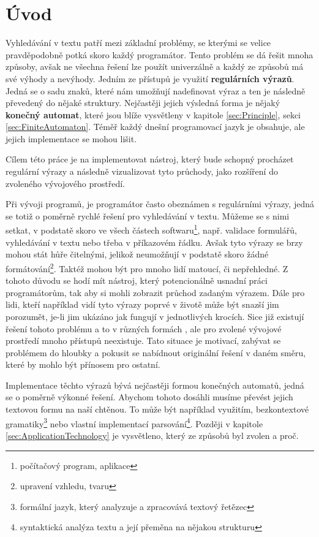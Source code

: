 \chapter{Úvod}\label{sec:Introduction}

Vyhledávání v textu patří mezi základní problémy, se kterými se velice pravděpodobně potká skoro každý programátor. 
Tento problém se dá řešit mnoha způsoby, avšak ne všechna řešení lze použít univerzálně a každý ze způsobů má své výhody a nevýhody.
Jedním ze přístupů je využití \textbf{regulárních výrazů}. 
Jedná se o sadu znaků, které nám umožňují nadefinovat výraz a ten je následně převedený do nějaké struktury. 
Nejčastěji jejich výsledná forma je nějaký \textbf{konečný automat}, které jsou blíže vysvětleny v kapitole \ref{sec:Principle}, sekci \ref{sec:FiniteAutomaton}.
Téměř každý dnešní programovací jazyk je obsahuje, ale jejich implementace se mohou lišit.

Cílem této práce je na implementovat nástroj, který bude schopný procházet regulární výrazy a následně vizualizovat tyto průchody, jako rozšíření do zvoleného vývojového prostředí.

Při vývoji programů, je programátor často obeznámen s regulárními výrazy, jedná se totiž o poměrně rychlé řešení pro vyhledávání v textu. 
Můžeme se s nimi setkat, v podstatě skoro ve všech částech softwaru\footnote{počítačový program, aplikace}, např. validace formulářů, vyhledávání v textu nebo třeba v příkazovém řádku.
Avšak tyto výrazy se brzy mohou stát hůře čitelnými, jelikož neumožňují v podstatě skoro žádné formátování\footnote{upravení vzhledu, tvaru}. 
Taktéž mohou být pro mnoho lidí matoucí, či nepřehledné.
Z tohoto důvodu se hodí mít nástroj, který potencionálně usnadní práci programátorům, tak aby si mohli zobrazit průchod zadaným výrazem.
Dále pro lidi, kteří například vidí tyto výrazy poprvé v životě může být snazší jim porozumět, je-li jim ukázáno jak fungují v jednotlivých krocích.
Sice již existují řešení tohoto problému a to v různých formách \cite{Dib, Regexper, RegExr}, ale pro zvolené vývojové prostředí mnoho přístupů neexistuje.
Tato situace je motivací, zabývat se problémem do hloubky a pokusit se nabídnout originální řešení v daném směru, které by mohlo být přínosem pro ostatní.

Implementace těchto výrazů bývá nejčastěji formou konečných automatů, jedná se o poměrně výkonné řešení. 
Abychom tohoto dosáhli musíme převést jejich textovou formu na naší chtěnou.
To může být například využitím, bezkontextové gramatiky\footnote{formální jazyk, který analyzuje a zpracovává textový řetězec} nebo vlastní implementací parsování\footnote{syntaktická analýza textu a její přeměna na nějakou strukturu}.
Později v kapitole \ref{sec:ApplicationTechnology} je vysvětleno, který ze způsobů byl zvolen a proč.

